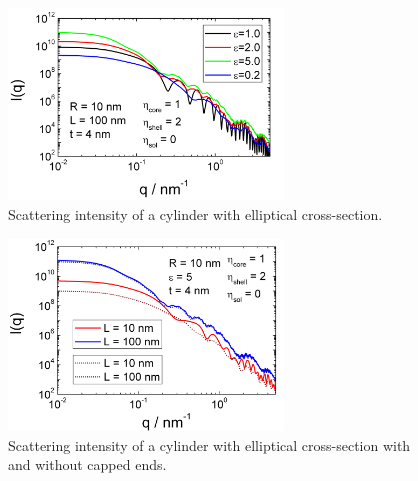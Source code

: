 \begin{figure}[htb]
\begin{center}
\includegraphics[width=0.65\textwidth,height=0.5\textwidth]{../images/form_factor/cylindrical_obj/ellCylShell1.png}
\end{center}
\caption{Scattering intensity of a cylinder with elliptical cross-section.}
\label{fig:ellCylShell1}
\end{figure}

\begin{figure}[htb]
\begin{center}
\includegraphics[width=0.65\textwidth,height=0.5\textwidth]{../images/form_factor/cylindrical_obj/ellCylShell1_2.png}
\end{center}
\caption{Scattering intensity of a cylinder with elliptical cross-section with and without capped ends.}
\label{fig:ellCylShell1_2}
\end{figure}

\vspace{5mm}

